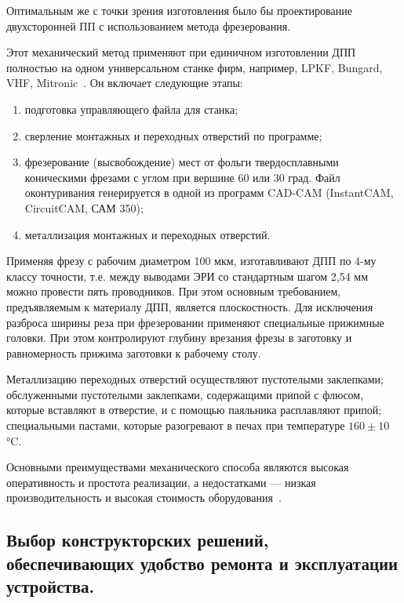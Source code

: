 
Оптимальным же с точки зрения изготовления было бы проектирование
двухсторонней ПП с использованием метода фрезерования.

Этот механический метод применяют при единичном изготовлении ДПП
полностью на одном универсальном станке фирм, например, LPKF, Bungard,
VHF, Mitronic~\cite{PirogovaEngineering}.
Он включает следующие этапы:
\begin{enumerate}
\item подготовка управляющего файла для станка;
  
\item сверление монтажных и переходных отверстий по программе;
\item фрезерование (высвобождение) мест от фольги твердосплавными коническими фрезами
  с углом при вершине 60 или 30 град.
  Файл оконтуривания генерируется в одной из программ CAD-CAM
  (InstantCAM, CircuitCAM, САМ 350);
  
\item металлизация монтажных и переходных отверстий.

\end{enumerate}

Применяя фрезу с рабочим диаметром 100 мкм, изготавливают ДПП по 4-му
классу точности, т.е. между выводами ЭРИ со стандартным шагом 2,54 мм
можно провести пять проводников.  При этом основным требованием,
предъявляемым к материалу ДПП, является плоскостность.  Для исключения
разброса ширины реза при фрезеровании применяют специальные прижимные
головки.  При этом контролируют глубину врезания фрезы в заготовку и
равномерность прижима заготовки к рабочему столу.

Металлизацию переходных отверстий осуществляют пустотелыми заклепками;
обслуженными пустотелыми заклепками, содержащими припой с флюсом,
которые вставляют в отверстие, и с помощью паяльника расплавляют
припой; специальными пастами, которые разогревают в
печах при температуре $160 \pm 10$°C.

Основными преимуществами механического способа являются высокая
оперативность и простота реализации, а недостатками — низкая
производительность и высокая стоимость
оборудования~\cite{PirogovaEngineering}.

\subsection{Выбор конструкторских решений, 
  обеспечивающих удобство ремонта
  и эксплуатации устройства.}

